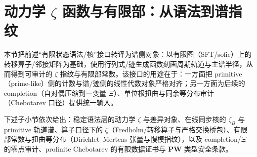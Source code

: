 \section{动力学 \texorpdfstring{$\zeta$}{zeta} 函数与有限部：从语法到谱指纹}\label{sec:zeta-finite-part}

本节把前述“有限状态语法/核”接口转译为谱侧对象：以有限图（SFT/sofic）上的转移算子/邻接矩阵为基础，使用行列式/迹生成函数刻画周期轨道与主谱半径，从而得到可审计的 \(\zeta\) 指纹与有限部常数。该接口的用途在于：一方面把 primitive（prime-like）侧的计数与谱/迹侧的线性代数对象严格对齐；另一方面为后续的 completion（自对偶压缩到一变量 \(\Xi\)）、单位根扭曲与同余等分布审计（Chebotarev 口径）提供统一输入。\par
下述子小节依次给出：稳定语法层的动力学 \(\zeta\) 与差异对象、在线同步核的 \(\zeta_B\) 与 primitive 轨道谱、算子口径下的 \(\zeta\)（Fredholm/转移算子与严格交换桥包）、有限部常数与扭曲等分布（Dirichlet--Mertens 张量与慢模指纹），以及 completion/\(\Xi\) 的零点审计、profinite Chebotarev 的有限数据证书与 \(\mathbf{PW}\) 类型安全条款。











